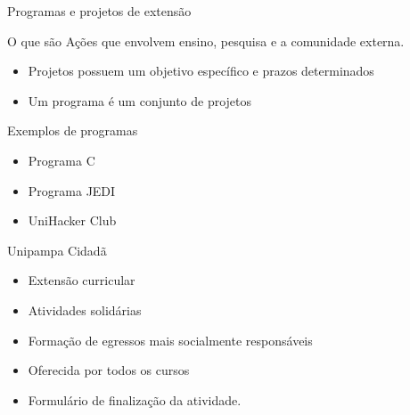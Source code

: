 \begin{frame}{{\sffamily Programas e projetos de extensão}}
  \begin{block}{O que são}
    Ações que envolvem ensino, pesquisa e a comunidade externa.
    \begin{itemize}
      \item Projetos possuem um objetivo específico e prazos determinados
      \item Um programa é um conjunto de projetos %
    \end{itemize}
  \end{block}

  \begin{block}{Exemplos de programas}
    \begin{itemize}
      \item Programa C
      \item Programa JEDI
      \item UniHacker Club
    \end{itemize}
  \end{block}

\end{frame}

\begin{frame}{{\sffamily Unipampa Cidadã}}
  \begin{block}{}
    \begin{itemize}
      \item Extensão curricular
      \item Atividades solidárias %
      \item Formação de egressos mais socialmente responsáveis %
      \item Oferecida por todos os cursos %
      \item Formulário de finalização da atividade.
    \end{itemize}
  \end{block}
\end{frame}
